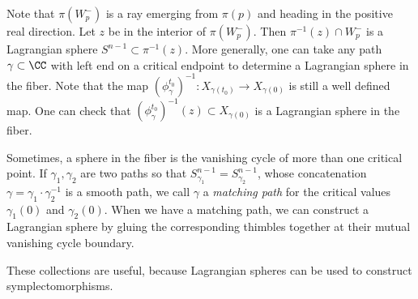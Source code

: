 




Note that $\pi(W^-_p)$ is a ray emerging from $\pi(p)$ and heading in the positive real direction. 
Let $z$ be in the interior of $\pi(W^-_p)$. 
Then $\pi^{-1}(z)\cap W^-_p$ is a Lagrangian sphere $S^{n-1}\subset \pi^{-1}(z)$. 
More generally, one can take any path $\gamma\subset \CC$ with left end on a critical endpoint to determine a Lagrangian sphere in the fiber. 
Note that the map  $(\phi_\gamma^{t_0})^{-1}: X_{\gamma(t_0)}\to X_{\gamma(0)}$ is still a well defined map. 
One can check that  $(\phi_{\gamma}^{t_0})^{-1}(z)\subset X_{\gamma(0)}$ is a Lagrangian sphere in the fiber. 

Sometimes, a sphere in the fiber is the vanishing cycle of more than one critical point.
If $\gamma_1, \gamma_2$ are two paths so that $S^{n-1}_{\gamma_1}=S^{n-1}_{\gamma_2}$, whose concatenation $\gamma=\gamma_1\cdot \gamma_2^{-1}$ is a smooth path, we call $\gamma$ a \emph{matching path} for the critical values $\gamma_1(0)$ and $\gamma_2(0)$. 
When we have a matching path, we can construct a Lagrangian sphere by gluing the corresponding thimbles together at their mutual vanishing cycle boundary.


These collections are useful, because Lagrangian spheres can be used to construct symplectomorphisms.


